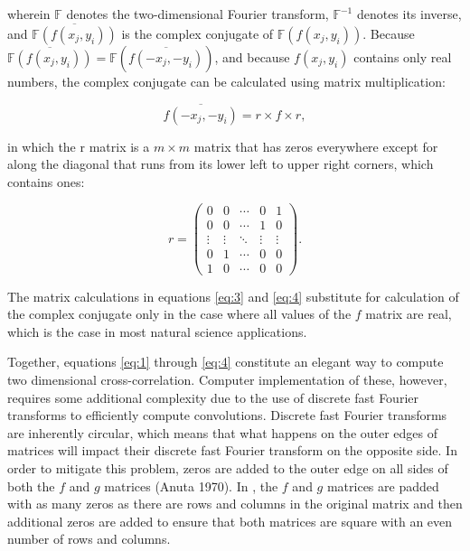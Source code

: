 \noindent wherein \(\mathbb{F}\) denotes the two-dimensional Fourier transform, \(\mathbb{F}^{-1}\) denotes its inverse, and \(\overline{\mathbb{F}\left(f\left(x_j, y_i\right)\right)}\) is the complex conjugate of \(\mathbb{F}\left(f\left(x_j, y_i\right)\right)\). Because \(\overline{\mathbb{F}\left(f\left(x_j, y_i\right)\right)} = \mathbb{F}\left(\overline{f\left(-x_j, -y_i\right)}\right)\), and because \(f\left(x_j, y_i\right)\) contains only real numbers, the complex conjugate can be calculated using matrix multiplication:

\begin{equation}
\overline{f\left(-x_j, -y_i\right)} = r  \times f \times r, 
\label{eq:3}
\end{equation}

\noindent in which the r matrix is a \(m \times m\) matrix that has zeros everywhere except for along the diagonal that runs from its lower left to upper right corners, which contains ones:

\begin{equation}
r = 
\begin{pmatrix}
0 & 0 & \cdots & 0 & 1 \\
0 & 0 & \cdots & 1 & 0 \\
\vdots  & \vdots  & \ddots & \vdots & \vdots \\
0 & 1 & \cdots & 0 & 0\\ 
1 & 0 & \cdots & 0 & 0
\end{pmatrix}.
\label{eq:4}
\end{equation}

\noindent The matrix calculations in equations \eqref{eq:3} and \eqref{eq:4} substitute for calculation of the complex conjugate only in the case where all values of the \(f\) matrix are real, which is the case in most natural science applications.

Together, equations \eqref{eq:1} through \eqref{eq:4} constitute an elegant way to compute two dimensional cross-correlation. Computer implementation of these, however, requires some additional complexity due to the use of discrete fast Fourier transforms to efficiently compute convolutions. Discrete fast Fourier transforms are inherently circular, which means that what happens on the outer edges of matrices will impact their discrete fast Fourier transform on the opposite side. In order to mitigate this problem, zeros are added to the outer edge on all sides of both the \(f\) and \(g\) matrices (Anuta 1970). In , the \(f\) and \(g\) matrices are padded with as many zeros as there are rows and columns in the original matrix and then additional zeros are added to ensure that both matrices are square with an even number of rows and columns.


